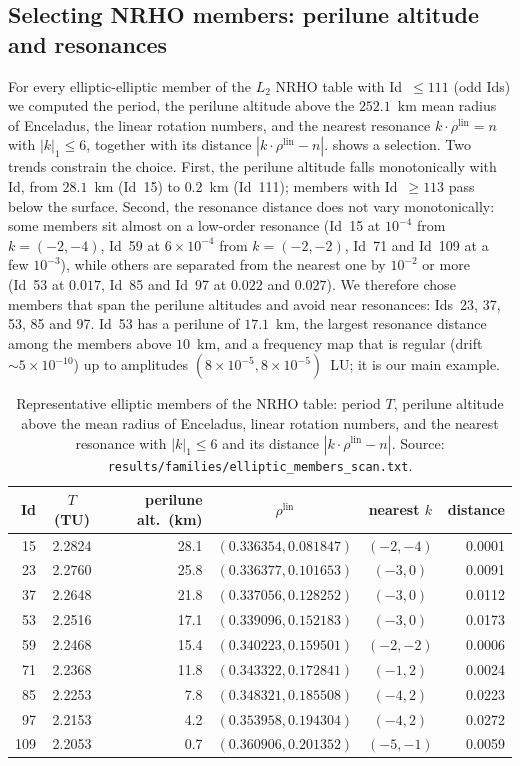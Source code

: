 \documentclass[11pt]{article}
\begin{document}
\subsection{Selecting NRHO members: perilune altitude and resonances}\label{sec:scan}
For every elliptic-elliptic member of the $L_2$ NRHO table with Id~$\le 111$ (odd Ids) we computed
the period, the perilune altitude above the $252.1$~km mean radius of Enceladus, the linear
rotation numbers, and the nearest resonance $k\cdot\rho^{\mathrm{lin}} = n$ with $|k|_1\le 6$,
together with its distance $|k\cdot\rho^{\mathrm{lin}} - n|$.  shows a selection.
Two trends constrain the choice. First, the perilune altitude falls monotonically with Id, from
$28.1$~km (Id~15) to $0.2$~km (Id~111); members with Id~$\ge 113$ pass below the surface. Second,
the resonance distance does not vary monotonically: some members sit almost on a low-order
resonance (Id~15 at $10^{-4}$ from $k=(-2,-4)$, Id~59 at $6\times10^{-4}$ from $k=(-2,-2)$, Id~71
and Id~109 at a few $10^{-3}$), while others are separated from the nearest one by $10^{-2}$ or
more (Id~53 at $0.017$, Id~85 and Id~97 at $0.022$ and $0.027$). We therefore chose members that
span the perilune altitudes and avoid near resonances: Ids~23, 37, 53, 85 and 97. Id~53 has a
perilune of $17.1$~km, the largest resonance distance among the members above $10$~km, and a
frequency map that is regular (drift $\sim5\times10^{-10}$) up to amplitudes
$(8\times10^{-5},8\times10^{-5})$~LU; it is our main example.

\begin{table}[t]
\centering
\caption{Representative elliptic members of the NRHO table: period $T$, perilune altitude above
the mean radius of Enceladus, linear rotation numbers, and the nearest resonance with $|k|_1\le6$
and its distance $|k\cdot\rho^{\mathrm{lin}}-n|$. Source:
\nolinkurl{results/families/elliptic_members_scan.txt}.}
\label{tab:scan}
\small
\begin{tabular}{rcrccr}
\toprule
Id & $T$ (TU) & perilune alt.\ (km) & $\rho^{\mathrm{lin}}$ & nearest $k$ & distance \\
\midrule
15  & 2.2824 & 28.1 & $(0.336354, 0.081847)$ & $(-2,-4)$ & 0.0001 \\
23  & 2.2760 & 25.8 & $(0.336377, 0.101653)$ & $(-3,0)$  & 0.0091 \\
37  & 2.2648 & 21.8 & $(0.337056, 0.128252)$ & $(-3,0)$  & 0.0112 \\
53  & 2.2516 & 17.1 & $(0.339096, 0.152183)$ & $(-3,0)$  & 0.0173 \\
59  & 2.2468 & 15.4 & $(0.340223, 0.159501)$ & $(-2,-2)$ & 0.0006 \\
71  & 2.2368 & 11.8 & $(0.343322, 0.172841)$ & $(-1,2)$  & 0.0024 \\
85  & 2.2253 &  7.8 & $(0.348321, 0.185508)$ & $(-4,2)$  & 0.0223 \\
97  & 2.2153 &  4.2 & $(0.353958, 0.194304)$ & $(-4,2)$  & 0.0272 \\
109 & 2.2053 &  0.7 & $(0.360906, 0.201352)$ & $(-5,-1)$ & 0.0059 \\
\bottomrule
\end{tabular}
\end{table}
\end{document}
